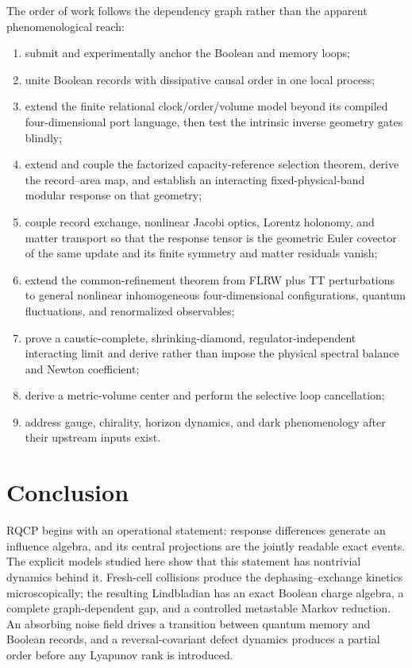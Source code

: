 The order of work follows the dependency graph rather than the apparent
phenomenological reach:
\begin{enumerate}
\item submit and experimentally anchor the Boolean and memory loops;
\item unite Boolean records with dissipative causal order in one local
process;
\item extend the finite relational clock/order/volume model beyond its
compiled four-dimensional port language, then test the intrinsic inverse
geometry gates blindly;
\item extend and couple the factorized capacity-reference selection theorem,
derive the record--area map, and establish an interacting fixed-physical-band
modular response on that geometry;
\item couple record exchange, nonlinear Jacobi optics, Lorentz holonomy, and
matter transport so that the response tensor is the geometric Euler covector
of the same update and its finite symmetry and matter residuals vanish;
\item extend the common-refinement theorem from FLRW plus TT perturbations to
general nonlinear inhomogeneous four-dimensional configurations, quantum
fluctuations, and renormalized observables;
\item prove a caustic-complete, shrinking-diamond, regulator-independent
interacting limit and derive rather than impose the physical spectral
balance and Newton coefficient;
\item derive a metric-volume center and perform the selective loop
cancellation;
\item address gauge, chirality, horizon dynamics, and dark phenomenology
after their upstream inputs exist.
\end{enumerate}

\section{Conclusion}
\label{sec:updated-conclusion}

RQCP begins with an operational statement: response differences generate an
influence algebra, and its central projections are the jointly readable exact
events.  The explicit models studied here show that this statement has
nontrivial dynamics behind it.  Fresh-cell collisions produce the
dephasing--exchange kinetics microscopically; the resulting Lindbladian has
an exact Boolean charge algebra, a complete graph-dependent gap, and a
controlled metastable Markov reduction.  An absorbing noise field drives a
transition between quantum memory and Boolean records, and a
reversal-covariant defect dynamics produces a partial order before any
Lyapunov rank is introduced.

